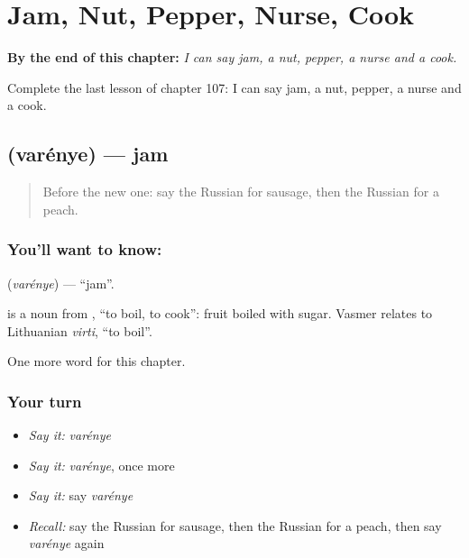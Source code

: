 
\chapter{Jam, Nut, Pepper, Nurse, Cook}
\label{ch:ru-jam-nut-pepper-nurse-cook}

\begin{chapteropening}
\textbf{By the end of this chapter:} \emph{I can say jam, a nut, pepper, a nurse and a cook.}

Complete the last lesson of chapter 107: I can say jam, a nut, pepper, a nurse and a cook.
\end{chapteropening}

\section[\texorpdfstring{\ru{варенье} (varénye)}{варенье (varénye)}]{ (varénye) — jam}

\label{lesson:RU-C107-jam}



\begin{quote}
Before the new one: say the Russian for sausage, then the Russian for a peach.
\end{quote}

\subsection*{You'll want to know: }
\textbf{} (\emph{varénye}) — \textquotedblleft{}jam\textquotedblright{}.

\begin{cousinweb}
\textbf{} is a noun from \emph{}, \textquotedblleft{}to boil, to cook\textquotedblright{}: fruit boiled with sugar. Vasmer relates \emph{} to Lithuanian \emph{virti}, \textquotedblleft{}to boil\textquotedblright{}.
\end{cousinweb}

\begin{grammarlens}[title={What you've built}]
One more word for this chapter.
\end{grammarlens}

\subsection*{Your turn}
\begin{itemize}
\raggedright
  \item \emph{Say it:} \emph{varénye}
  \item \emph{Say it:} \emph{varénye}, once more
  \item \emph{Say it:} say \emph{varénye}
  \item \emph{Recall:} say the Russian for sausage, then the Russian for a peach, then say \emph{varénye} again
\end{itemize}

